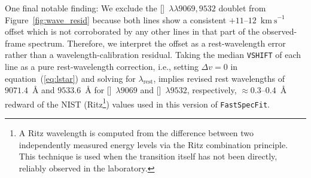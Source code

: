 \documentclass[modern,linenumbers]{aastex701}
\newcommand{\todo}[1]{{\color{red}\textbf{TODO:} #1}}
\newcommand{\fastspecfit}{\texttt{FastSpecFit}}
\newcommand{\kms}{\ensuremath{\mathrm{km~s}^{-1}}}
\newcommand{\siii}{[\ion{S}{3}]}
\newcommand{\ha}{H\ensuremath{\alpha}}
\newcommand{\siiidoublet}{[\ion{S}{3}]~$\lambda\lambda9069,9532$}
\begin{document}
One final notable finding: We exclude the \siiidoublet{} doublet from
Figure~\ref{fig:wave_resid} because both lines show a consistent
$+11$--$12$~\kms{} offset which is not corroborated by any other lines
in that part of the observed-frame spectrum. Therefore, we interpret
the offset as a rest-wavelength error rather than a
wavelength-calibration residual. Taking the median \texttt{VSHIFT} of
each line as a pure rest-wavelength correction, i.e., setting $\Delta
v=0$ in equation~(\ref{eq:lstar}) and solving for
$\lambda_\mathrm{rest}$, implies revised rest wavelengths of
$9071.4$~\AA{} and $9533.6$~\AA{} for \siii{}~$\lambda9069$ and
\siii{}~$\lambda9532$, respectively, $\approx0.3$--$0.4$~\AA{} redward
of the NIST (Ritz\footnote{A Ritz wavelength is computed from the
difference between two independently measured energy levels via the
Ritz combination principle. This technique is used when the transition
itself has not been directly, reliably observed in the laboratory.})
values used in this version of \fastspecfit.


%
%
\end{document}
